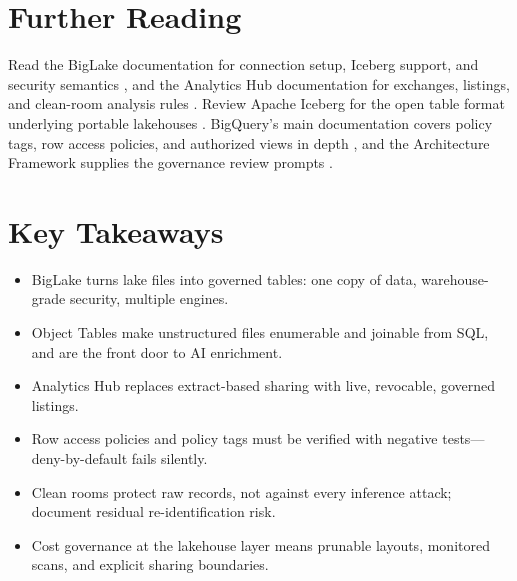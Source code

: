 \section{Further Reading}
Read the BigLake documentation for connection setup, Iceberg support, and security semantics \cite{googlecloudbiglake}, and the Analytics Hub documentation for exchanges, listings, and clean-room analysis rules \cite{googlecloudanalyticshub}. Review Apache Iceberg for the open table format underlying portable lakehouses \cite{apacheiceberg}. BigQuery's main documentation covers policy tags, row access policies, and authorized views in depth \cite{googlecloudbigquerydocs}, and the Architecture Framework supplies the governance review prompts \cite{googlecloudarchitectureframework}.

\section*{Key Takeaways}
\begin{itemize}
    \item BigLake turns lake files into governed tables: one copy of data, warehouse-grade security, multiple engines.
    \item Object Tables make unstructured files enumerable and joinable from SQL, and are the front door to AI enrichment.
    \item Analytics Hub replaces extract-based sharing with live, revocable, governed listings.
    \item Row access policies and policy tags must be verified with negative tests---deny-by-default fails silently.
    \item Clean rooms protect raw records, not against every inference attack; document residual re-identification risk.
    \item Cost governance at the lakehouse layer means prunable layouts, monitored scans, and explicit sharing boundaries.
\end{itemize}

